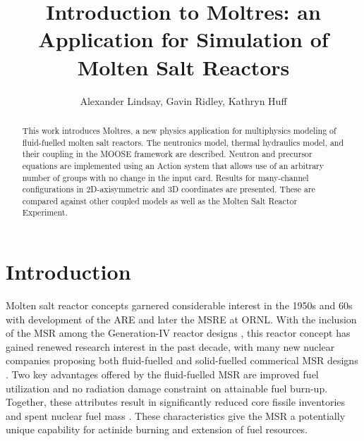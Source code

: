 \documentclass{article}
\title{Introduction to Moltres: an Application for Simulation of Molten Salt Reactors}
\author{Alexander Lindsay, Gavin Ridley, Kathryn Huff}
\let\Oldsection\section
\renewcommand{\section}{\FloatBarrier\Oldsection}
\begin{document}
\maketitle

\begin{abstract}

This work introduces Moltres, a new physics application for multiphysics
modeling of fluid-fuelled molten salt reactors. The neutronics model, thermal
hydraulics model, and their coupling in the MOOSE framework are
described. Neutron and precursor equations are implemented using an Action
system that allows use of an arbitrary number of groups with no change in the
input card. Results for many-channel configurations in 2D-axisymmetric and 3D
coordinates are presented. These are compared against other coupled models as
well as the Molten Salt Reactor Experiment.

\end{abstract}

\section{Introduction}

Molten salt reactor concepts garnered considerable interest in the 1950s and 60s
with development of the \gls{ARE} and later the \gls{MSRE} at \gls{ORNL}.  With
the inclusion of the \gls{MSR} among the Generation-IV reactor designs
\cite{noauthor_gif_2015}, this reactor concept has gained renewed research
interest in the past decade, with many new nuclear companies proposing both
fluid-fuelled and solid-fuelled commerical \gls{MSR} designs
\cite{hyde_liquid_2015,leblanc_integral_2015,noauthor_-able_2017,scarlat_design_2014,noauthor_neutronics_2016}. Two
key advantages offered by the fluid-fuelled \gls{MSR} are improved fuel
utilization and no radiation damage constraint on attainable fuel
burn-up. Together, these attributes result in significantly reduced core fissile
inventories and spent nuclear fuel mass \cite{noauthor_gen_2008}.  These
characteristics give the \gls{MSR} a potentially unique capability for actinide
burning and extension of fuel resources.
\end{document}
